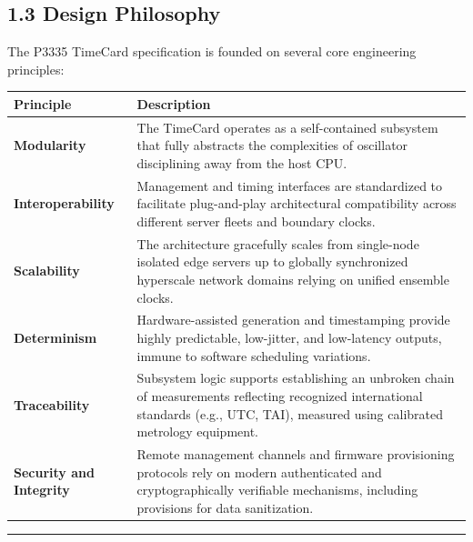 \subsection{1.3 Design Philosophy}\label{design-philosophy}

The P3335 TimeCard specification is founded on several core engineering
principles:

{\def\LTcaptype{none} %
\begin{longtable}[]{@{}
  >{\raggedright\arraybackslash}p{}
  >{\raggedright\arraybackslash}p{}@{}}
\toprule\noalign{}
\begin{minipage}[b]{\linewidth}\raggedright
Principle
\end{minipage} & \begin{minipage}[b]{\linewidth}\raggedright
Description
\end{minipage} \\
\midrule\noalign{}
\endhead
\bottomrule\noalign{}
\endlastfoot
\textbf{Modularity} & The TimeCard operates as a self-contained
subsystem that fully abstracts the complexities of oscillator
disciplining away from the host CPU. \\
\textbf{Interoperability} & Management and timing interfaces are
standardized to facilitate plug-and-play architectural compatibility
across different server fleets and boundary clocks. \\
\textbf{Scalability} & The architecture gracefully scales from
single-node isolated edge servers up to globally synchronized hyperscale
network domains relying on unified ensemble clocks. \\
\textbf{Determinism} & Hardware-assisted generation and timestamping
provide highly predictable, low-jitter, and low-latency outputs, immune
to software scheduling variations. \\
\textbf{Traceability} & Subsystem logic supports establishing an
unbroken chain of measurements reflecting recognized international
standards (e.g., UTC, TAI), measured using calibrated metrology
equipment. \\
\textbf{Security and Integrity} & Remote management channels and
firmware provisioning protocols rely on modern authenticated and
cryptographically verifiable mechanisms, including provisions for data
sanitization. \\
\end{longtable}
}

\begin{center}\rule{0.5\linewidth}{0.5pt}\end{center}

